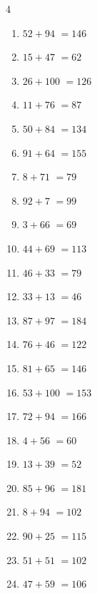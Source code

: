 \begin{multicols}{4}
\begin{enumerate}
  \item $52+94$
        $=146$

  \item $15+47$
        $=62$

  \item $26+100$
        $=126$

  \item $11+76$
        $=87$

  \item $50+84$
        $=134$

  \item $91+64$
        $=155$

  \item $8+71$
        $=79$

  \item $92+7$
        $=99$

  \item $3+66$
        $=69$

  \item $44+69$
        $=113$

  \item $46+33$
        $=79$

  \item $33+13$
        $=46$

  \item $87+97$
        $=184$

  \item $76+46$
        $=122$

  \item $81+65$
        $=146$

  \item $53+100$
        $=153$

  \item $72+94$
        $=166$

  \item $4+56$
        $=60$

  \item $13+39$
        $=52$

  \item $85+96$
        $=181$

  \item $8+94$
        $=102$

  \item $90+25$
        $=115$

  \item $51+51$
        $=102$

  \item $47+59$
        $=106$


\end{enumerate}
\end{multicols}
